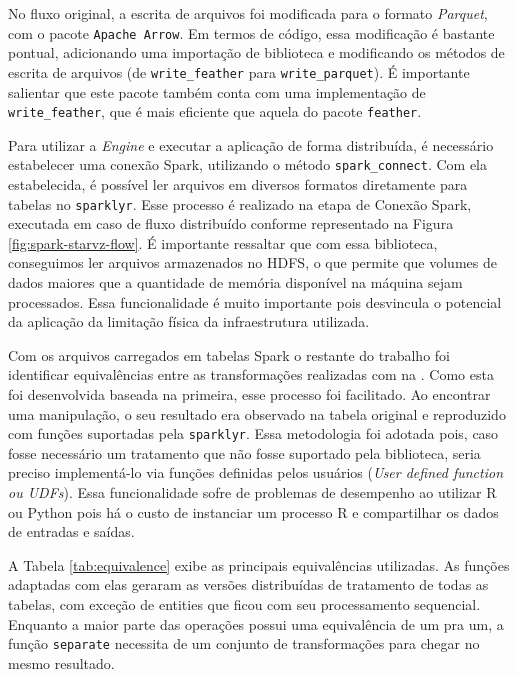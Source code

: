 No fluxo original, a escrita de arquivos foi modificada para o formato 
\textit{Parquet}, com o pacote \texttt{Apache Arrow}. Em termos de código, essa 
modificação é bastante pontual, adicionando uma importação de biblioteca e 
modificando os métodos de escrita de arquivos (de \texttt{write\_feather} 
para \texttt{write\_parquet}). É importante salientar que este pacote também 
conta com uma implementação de \texttt{write\_feather}, que é mais eficiente 
que aquela do pacote \texttt{feather}.

Para utilizar a \textit{Engine} e executar a aplicação de forma distribuída, é 
necessário estabelecer uma conexão Spark, utilizando o método 
\texttt{spark\_connect}. Com ela estabelecida, é possível ler arquivos em 
diversos formatos diretamente para tabelas no \texttt{sparklyr}. Esse processo 
é realizado na etapa de Conexão Spark, executada em caso de fluxo distribuído 
conforme representado na Figura \ref{fig:spark-starvz-flow}. É importante 
ressaltar que com essa biblioteca, conseguimos ler arquivos armazenados no HDFS, 
o que permite que volumes de dados maiores que a quantidade de memória 
disponível na máquina sejam processados. Essa funcionalidade é muito importante 
pois desvincula o potencial da aplicação da limitação física da infraestrutura 
utilizada.

Com os arquivos carregados em tabelas Spark o restante do trabalho 
foi identificar equivalências entre as transformações realizadas com 
 na . Como esta foi desenvolvida baseada na 
primeira, esse processo foi facilitado. Ao encontrar uma manipulação, o seu 
resultado era observado na tabela original e reproduzido com funções suportadas 
pela \texttt{sparklyr}. Essa metodologia foi adotada pois, caso fosse necessário 
um tratamento que não fosse suportado pela biblioteca, seria preciso 
implementá-lo via funções definidas pelos usuários (\emph{User defined function 
ou UDFs}). Essa funcionalidade sofre de problemas de desempenho ao utilizar R ou 
Python pois há o custo de instanciar um processo R e compartilhar os dados de 
entradas e saídas. 

A Tabela \ref{tab:equivalence} exibe as principais equivalências utilizadas. 
As funções adaptadas com elas geraram as versões distribuídas de tratamento de 
todas as tabelas, com exceção de entities que ficou com seu processamento 
sequencial. Enquanto a maior parte das operações possui uma equivalência de um 
pra um, a função \texttt{separate} necessita de um conjunto de transformações 
para chegar no mesmo resultado. 

